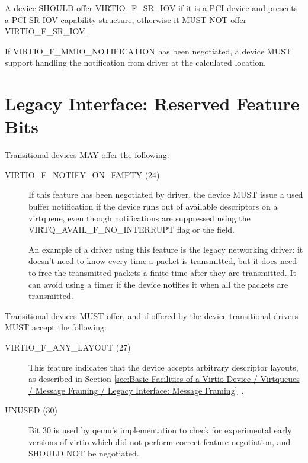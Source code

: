 A device SHOULD offer VIRTIO_F_SR_IOV if it is a PCI device
and presents a PCI SR-IOV capability structure, otherwise
it MUST NOT offer VIRTIO_F_SR_IOV.

If VIRTIO_F_MMIO_NOTIFICATION has been negotiated, a device
MUST support handling the notification from driver at the
calculated location.

\section{Legacy Interface: Reserved Feature Bits}\label{sec:Reserved Feature Bits / Legacy Interface: Reserved Feature Bits}

Transitional devices MAY offer the following:
\begin{description}
\item[VIRTIO_F_NOTIFY_ON_EMPTY (24)] If this feature
  has been negotiated by driver, the device MUST issue
  a used buffer notification if the device runs
  out of available descriptors on a virtqueue, even though
  notifications are suppressed using the VIRTQ_AVAIL_F_NO_INTERRUPT
  flag or the  field.
\begin{note}
  An example of a driver using this feature is the legacy
  networking driver: it doesn't need to know every time a packet
  is transmitted, but it does need to free the transmitted
  packets a finite time after they are transmitted. It can avoid
  using a timer if the device notifies it when all the packets
  are transmitted.
\end{note}
\end{description}

Transitional devices MUST offer, and if offered by the device
transitional drivers MUST accept the following:
\begin{description}
\item[VIRTIO_F_ANY_LAYOUT (27)] This feature indicates that the device
  accepts arbitrary descriptor layouts, as described in Section
  \ref{sec:Basic Facilities of a Virtio Device / Virtqueues / Message Framing / Legacy Interface: Message Framing}~.

\item[UNUSED (30)] Bit 30 is used by qemu's implementation to check
  for experimental early versions of virtio which did not perform
  correct feature negotiation, and SHOULD NOT be negotiated.
\end{description}
